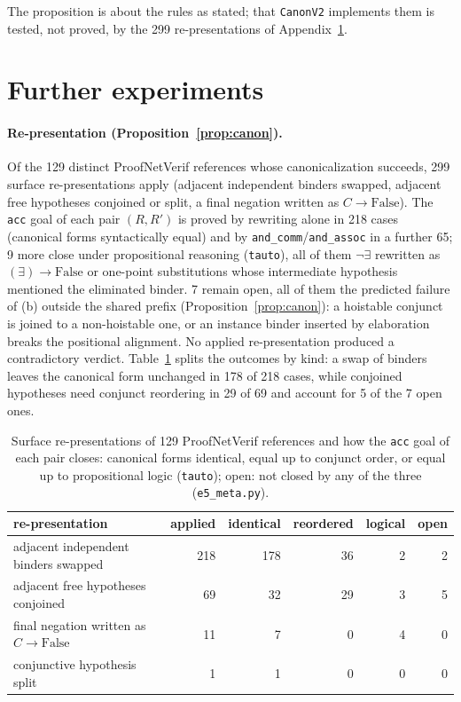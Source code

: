 \documentclass[10pt]{article}
\theoremstyle{definition}
\begin{document}
The proposition is about the rules as stated; that \texttt{CanonV2} implements them is tested, not
proved, by the 299 re-presentations of Appendix~\ref{app:more}.

\section{Further experiments}\label{app:more}

\paragraph{Re-presentation (Proposition~\ref{prop:canon}).} Of the 129 distinct ProofNetVerif
references whose canonicalization succeeds, 299 surface re-presentations apply (adjacent
independent binders swapped, adjacent free hypotheses conjoined or split, a final negation
written as $C\to\mathrm{False}$). The \texttt{acc} goal of each pair $(R,R')$ is proved by
rewriting alone in 218 cases (canonical forms syntactically equal) and by
\texttt{and\_comm}/\texttt{and\_assoc} in a further 65; 9 more close under propositional
reasoning (\texttt{tauto}), all of them $\neg\exists$ rewritten as $(\exists)\to\mathrm{False}$
or one-point substitutions whose intermediate hypothesis mentioned the eliminated binder.
7 remain open, all of them the predicted failure of (b) outside the shared prefix
(Proposition~\ref{prop:canon}): a hoistable conjunct is joined to a non-hoistable one, or an
instance binder inserted by elaboration breaks the positional alignment. No applied
re-presentation produced a contradictory verdict. Table~\ref{tab:repr} splits the outcomes by
kind: a swap of binders leaves the canonical form unchanged in 178 of 218 cases, while conjoined
hypotheses need conjunct reordering in 29 of 69 and account for 5 of the 7 open ones.

\begin{table}[h]
\centering\small
\begin{tabular}{lrrrrr}
\toprule
re-presentation & applied & identical & reordered & logical & open\\
\midrule
adjacent independent binders swapped & 218 & 178 & 36 & 2 & 2\\
adjacent free hypotheses conjoined & 69 & 32 & 29 & 3 & 5\\
final negation written as $C\to\mathrm{False}$ & 11 & 7 & 0 & 4 & 0\\
conjunctive hypothesis split & 1 & 1 & 0 & 0 & 0\\
\bottomrule
\end{tabular}
\caption{Surface re-presentations of 129 ProofNetVerif references and how the \texttt{acc} goal
of each pair closes: canonical forms identical, equal up to conjunct order, or equal up to
propositional logic (\texttt{tauto}); open: not closed by any of the three
(\texttt{e5\_meta.py}).}
\label{tab:repr}
\end{table}
\end{document}
